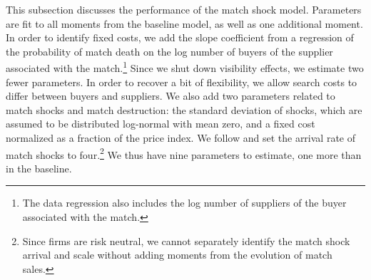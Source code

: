 \documentclass[12pt]{article} \usepackage{amsmath,amssymb,amsthm,geometry,graphicx,setspace,algorithm,algpseudocode,float}
\begin{document}
This subsection discusses the performance of the match shock model. Parameters are fit to all moments from the baseline model, as well as one additional moment.  In order to identify fixed costs, we add the slope coefficient from a regression of the probability of match death on the log number of buyers of the supplier associated with the match.\footnote{The data regression also includes the log number of suppliers of the buyer associated with the match.}  Since we shut down visibility effects, we estimate two fewer parameters.  In order to recover a bit of flexibility, we allow search costs to differ between buyers and suppliers.  We also add two parameters related to match shocks and match destruction: the standard deviation of shocks, which are assumed to be distributed log-normal with mean zero, and a fixed cost normalized as a fraction of the price index.  We follow \citet{eaton2014a} and set the arrival rate of match shocks to four.\footnote{Since firms are risk neutral, we cannot separately identify the match shock arrival and scale without adding moments from the evolution of match sales.}  We thus have nine parameters to estimate, one more than in the baseline. 
\end{document}
